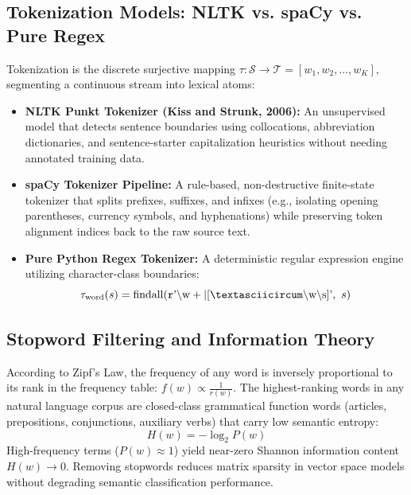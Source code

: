 \subsection{Tokenization Models: NLTK vs. spaCy vs. Pure Regex}
Tokenization is the discrete surjective mapping $\tau: \mathcal{S} \to \mathcal{T} = [w_1, w_2, \dots, w_K]$, segmenting a continuous stream into lexical atoms:
\begin{itemize}
    \item \textbf{NLTK Punkt Tokenizer (Kiss and Strunk, 2006):} An unsupervised model that detects sentence boundaries using collocations, abbreviation dictionaries, and sentence-starter capitalization heuristics without needing annotated training data.
    \item \textbf{spaCy Tokenizer Pipeline:} A rule-based, non-destructive finite-state tokenizer that splits prefixes, suffixes, and infixes (e.g., isolating opening parentheses, currency symbols, and hyphenations) while preserving token alignment indices back to the raw source text.
    \item \textbf{Pure Python Regex Tokenizer:} A deterministic regular expression engine utilizing character-class boundaries:
    \begin{equation}
        \tau_{\text{word}}(s) = \operatorname{findall}(\texttt{r}\text{'}\backslash\text{w}+|[\textasciicircum\backslash\text{w}\backslash\text{s}]\text{'},\ s)
    \end{equation}
\end{itemize}

\subsection{Stopword Filtering and Information Theory}
According to Zipf's Law, the frequency of any word is inversely proportional to its rank in the frequency table: $f(w) \propto \frac{1}{r(w)}$. The highest-ranking words in any natural language corpus are closed-class grammatical function words (articles, prepositions, conjunctions, auxiliary verbs) that carry low semantic entropy:
\begin{equation}
    H(w) = -\log_2 P(w)
\end{equation}
High-frequency terms ($P(w) \approx 1$) yield near-zero Shannon information content $H(w) \to 0$. Removing stopwords reduces matrix sparsity in vector space models without degrading semantic classification performance.

